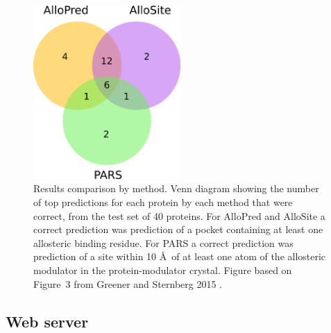 \begin{figure}
\centering

\includegraphics[width=0.5\textwidth]{figures/results_venn/results_venn}

\caption[Venn diagram comparing the performance of AlloPred on the test set to existing methods]
{Results comparison by method.
Venn diagram showing the number of top predictions for each protein by each method that were correct, from the test set of 40 proteins.
For AlloPred and AlloSite a correct prediction was prediction of a pocket containing at least one allosteric binding residue.
For PARS a correct prediction was prediction of a site within 10 \AA\ of at least one atom of the allosteric modulator in the protein-modulator crystal.
Figure based on Figure~3 from Greener and Sternberg 2015 \cite{Greener2015}.}

\label{fig:results_venn}
\end{figure}


\subsection{Web server}

